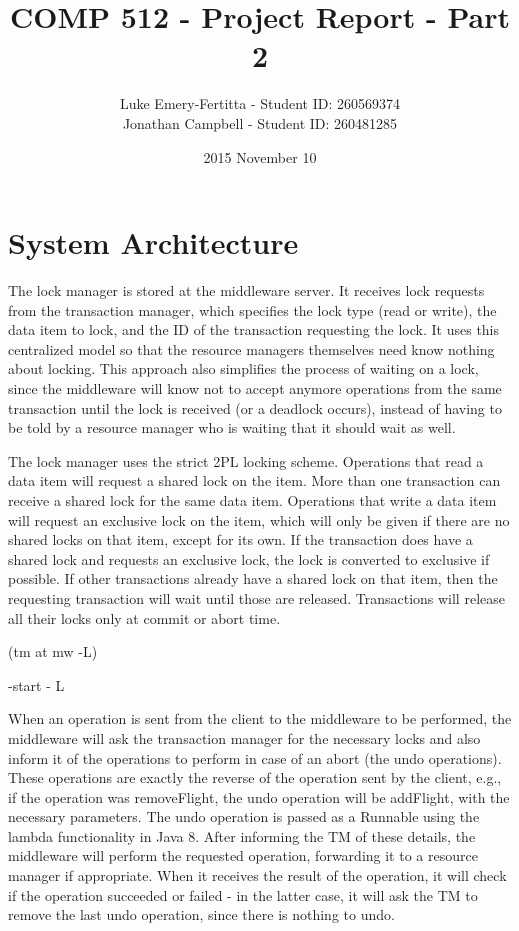 \documentclass[11pt]{article}
\begin{document}
\title{COMP 512 - Project Report - Part 2}
\author{Luke Emery-Fertitta - Student ID: 260569374 \\ Jonathan Campbell - Student ID: 260481285}
\date{2015 November 10}
\maketitle

\section*{System Architecture}

The lock manager is stored at the middleware server. It receives lock requests from the transaction manager, which specifies the lock type (read or write), the data item to lock, and the ID of the transaction requesting the lock. It uses this centralized model so that the resource managers themselves need know nothing about locking. This approach also simplifies the process of waiting on a lock, since the middleware will know not to accept anymore operations from the same transaction until the lock is received (or a deadlock occurs), instead of having to be told by a resource manager who is waiting that it should wait as well.

The lock manager uses the strict 2PL locking scheme. Operations that read a data item will request a shared lock on the item. More than one transaction can receive a shared lock for the same data item. Operations that write a data item will request an exclusive lock on the item, which will only be given if there are no shared locks on that item, except for its own. If the transaction does have a shared lock and requests an exclusive lock, the lock is converted to exclusive if possible. If other transactions already have a shared lock on that item, then the requesting transaction will wait until those are released. Transactions will release all their locks only at commit or abort time.

(tm at mw -L)

-start - L

When an operation is sent from the client to the middleware to be performed, the middleware will ask the transaction manager for the necessary locks and also inform it of the operations to perform in case of an abort (the undo operations). These operations are exactly the reverse of the operation sent by the client, e.g., if the operation was removeFlight, the undo operation will be addFlight, with the necessary parameters. The undo operation is passed as a Runnable using the lambda functionality in Java 8. After informing the TM of these details, the middleware will perform the requested operation, forwarding it to a resource manager if appropriate. When it receives the result of the operation, it will check if the operation succeeded or failed - in the latter case, it will ask the TM to remove the last undo operation, since there is nothing to undo.
\end{document}
